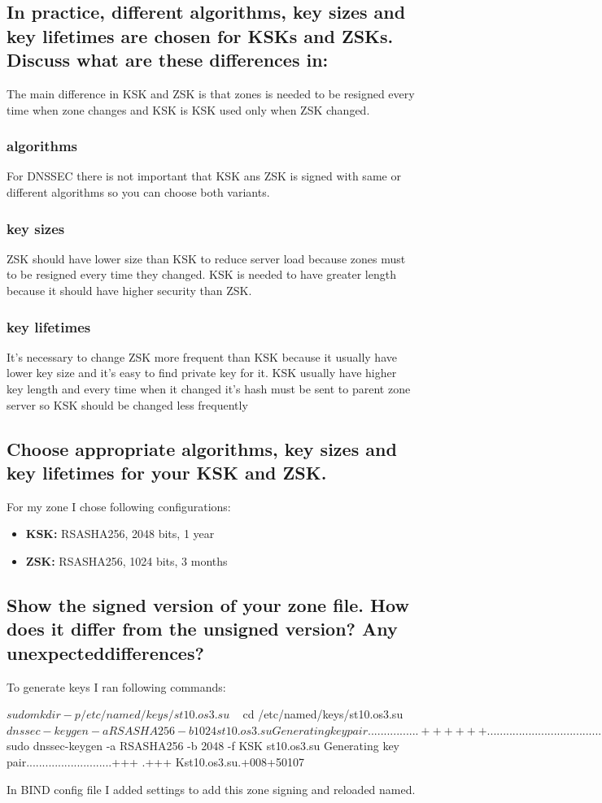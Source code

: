 \documentclass[a4paper,11pt]{article}
\begin{document}
\subsection{In practice, different algorithms, key sizes and key lifetimes are chosen for KSKs and ZSKs. Discuss what are these differences in:}
The main difference in KSK and ZSK is that zones is needed to be resigned every time when zone changes and KSK is KSK used only when ZSK changed.
\subsubsection{algorithms}
For DNSSEC there is not important that KSK ans ZSK is signed with same or different algorithms so you can choose both variants.
\subsubsection{key sizes} ZSK should have lower size than KSK to reduce server load because zones must to be resigned every time they changed. KSK is needed to have greater length because it should have higher security than ZSK.
\subsubsection{key lifetimes}
It's necessary to change ZSK more frequent than KSK because it usually have lower key size and it's easy to find private key for it. KSK usually have higher key length and every time when it changed it's hash must be sent to parent zone server so KSK should be changed less frequently

\subsection{Choose appropriate algorithms, key sizes and key lifetimes for your KSK and ZSK.}
For my zone I chose following configurations: 
\begin{itemize}
	\item \textbf{KSK:} RSASHA256, 2048 bits, 1 year
	\item \textbf{ZSK:} RSASHA256, 1024 bits, 3 months
\end{itemize}

\subsection{Show the signed version of your zone file. How does it differ from the unsigned version? Any unexpecteddifferences?}
To generate keys I ran following commands:
\begin{bashcode}
$  sudo mkdir -p /etc/named/keys/st10.os3.su
$  ~  cd /etc/named/keys/st10.os3.su 
$ dnssec-keygen -a RSASHA256 -b 1024 st10.os3.su
Generating key pair................++++++ ........................................++++++ 

$ sudo dnssec-keygen -a RSASHA256 -b 2048 -f KSK st10.os3.su
Generating key pair...........................+++ .+++ 
Kst10.os3.su.+008+50107
\end{bashcode}
In BIND config file I added settings to add this zone signing and reloaded named.
\end{document}

